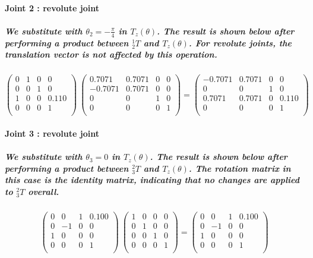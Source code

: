 \paragraph{Joint 2 : revolute joint}
\subparagraph{We substitute with $\theta_2 = -\frac{\pi}{4}$ in $T_z(\theta)$. The result is shown below after performing a product between $^{1}_2T$ and $T_z(\theta)$. For revolute joints, the translation vector is not affected by this operation.}
\[
\begin{pmatrix}
0 & 1 & 0 & 0 \\
0 & 0 & 1 & 0 \\
1 & 0 & 0 & 0.110 \\
0 & 0 & 0 & 1 \\
\end{pmatrix}
\
\begin{pmatrix}
0.7071 & 0.7071 & 0 & 0 \\
-0.7071 & 0.7071 & 0 & 0 \\
0 & 0 & 1 & 0 \\
0 & 0 & 0 & 1 \\
\end{pmatrix}
=
\begin{pmatrix}
-0.7071 & 0.7071 & 0 & 0 \\
0 & 0 & 1 & 0 \\
0.7071 & 0.7071 & 0 & 0.110 \\
0 & 0 & 0 & 1 \\
\end{pmatrix}
\]

\paragraph{Joint 3 : revolute joint}
\subparagraph{We substitute with $\theta_3 = 0$ in $T_z(\theta)$. The result is shown below after performing a product between $^{2}_3T$ and $T_z(\theta)$. The rotation matrix in this case is the identity matrix, indicating that no changes are applied to \( ^{2}_3T \) overall.}
\[
\begin{pmatrix}
0 & 0 & 1 & 0.100 \\
0 & -1 & 0 & 0 \\
1 & 0 & 0 & 0 \\
0 & 0 & 0 & 1 \\
\end{pmatrix}
\
\begin{pmatrix}
1 & 0 & 0 & 0 \\
0 & 1 & 0 & 0 \\
0 & 0 & 1 & 0 \\
0 & 0 & 0 & 1 \\
\end{pmatrix}
=
\begin{pmatrix}
0 & 0 & 1 & 0.100 \\
0 & -1 & 0 & 0 \\
1 & 0 & 0 & 0 \\
0 & 0 & 0 & 1 \\
\end{pmatrix}
\]


